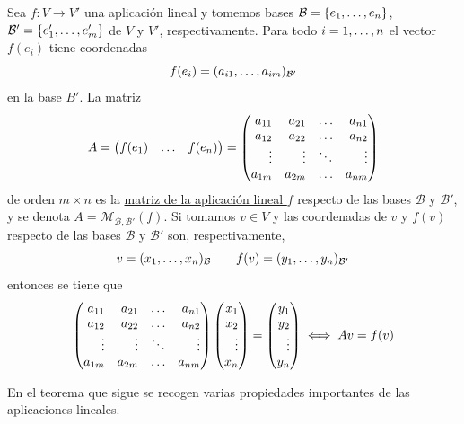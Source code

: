 \documentclass[12pt]{report}
\theoremstyle{definition}
\theoremstyle{definition}
\theoremstyle{remark}
\begin{document}
Sea $f \colon V \to V'$ una aplicación lineal y tomemos bases $\mathcal{B} = \{e_1,\mathellipsis,e_n\}$, $\mathcal{B}' = \{e_1',\mathellipsis,e_m'\}$ de $V$ y $V'$, respectivamente. Para todo $i = 1, \mathellipsis, n$ el vector $f(e_i)$ tiene coordenadas 
\[f(e_i) = (a_{i1},\mathellipsis,a_{im})_{\mathcal{B'}}\]
en la base $B'$. La matriz
\[A = \begin{pmatrix*}[r]
f(e_1) & \mathellipsis & f(e_n)
\end{pmatrix*}
=
\begin{pmatrix*}[r]
a_{11} & a_{21} & \mathellipsis & a_{n1} \\
a_{12} & a_{22} & \mathellipsis & a_{n2} \\
\vdots & \vdots & \ddots & \vdots \\
a_{1m} & a_{2m} & \mathellipsis & a_{nm}
\end{pmatrix*}\]
de orden $m \times n$ es la \ul{matriz de la aplicación lineal $f$} respecto de las bases $\mathcal{B}$ y $\mathcal{B}'$, y se denota $A = \mathcal{M}_{\mathcal{B},\mathcal{B}'}(f)$. Si tomamos $v \in V$ y las coordenadas de $v$ y $f(v)$ respecto de las bases $\mathcal{B}$ y $\mathcal{B'}$ son, respectivamente,
\[v = (x_1,\mathellipsis,x_n)_{\mathcal{B}} \qquad f(v) = (y_1,\mathellipsis,y_n)_{\mathcal{B}'}\]
entonces se tiene que
\[\begin{pmatrix*}[r]
a_{11} & a_{21} & \mathellipsis & a_{n1} \\
a_{12} & a_{22} & \mathellipsis & a_{n2} \\
\vdots & \vdots & \ddots & \vdots \\
a_{1m} & a_{2m} & \mathellipsis & a_{nm}
\end{pmatrix*}
\begin{pmatrix*}[r]
    x_1 \\
    x_2 \\
    \vdots \\
    x_n
\end{pmatrix*} =
\begin{pmatrix*}[r]
    y_1 \\
    y_2 \\
    \vdots \\
    y_n
\end{pmatrix*}
\iff Av = f(v)
\]

En el teorema que sigue se recogen varias propiedades importantes de las aplicaciones lineales.
\end{document}
